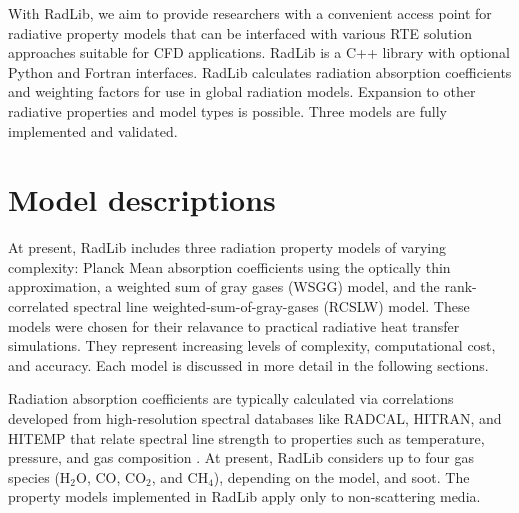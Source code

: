 \documentclass[preprint,12pt]{elsarticle}
\begin{document}
With RadLib, we aim to provide researchers with a convenient access point for radiative property models that can be interfaced with various RTE solution approaches suitable for CFD applications. RadLib is a C++ library with optional Python and Fortran interfaces. RadLib calculates radiation absorption coefficients and weighting factors for use in global radiation models. Expansion to other radiative properties and model types is possible. Three models are fully implemented and validated. 


\section{Model descriptions} \label{s:models}

At present, RadLib includes three radiation property models of varying complexity: Planck Mean absorption coefficients using the optically thin approximation, a weighted sum of gray gases (WSGG) model, and the rank-correlated spectral line weighted-sum-of-gray-gases (RCSLW) model. These models were chosen for their relavance to practical radiative heat transfer simulations. They represent increasing levels of complexity, computational cost, and accuracy. Each model is discussed in more detail in the following sections.


Radiation absorption coefficients are typically calculated via correlations developed from high-resolution spectral databases like RADCAL, HITRAN, and HITEMP \citep{Grosshandler_1993,Rothman_2010} that relate spectral line strength to properties such as temperature, pressure, and gas composition \citep{Zhang_2002b}. At present, RadLib considers up to four gas species (H$_2$O, CO, CO$_2$, and CH$_4$), depending on the model, and soot. The property models implemented in RadLib apply only to non-scattering media. 
\end{document}
